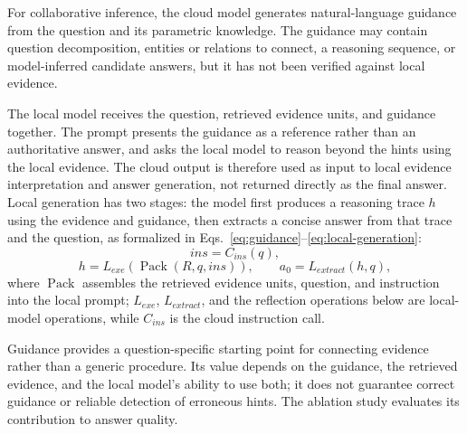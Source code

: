\documentclass[a4paper,fleqn]{cas-dc}
\begin{document}
For collaborative inference, the cloud model generates natural-language guidance from the question and its parametric knowledge. The guidance may contain question decomposition, entities or relations to connect, a reasoning sequence, or model-inferred candidate answers, but it has not been verified against local evidence.

The local model receives the question, retrieved evidence units, and guidance together. The prompt presents the guidance as a reference rather than an authoritative answer, and asks the local model to reason beyond the hints using the local evidence. The cloud output is therefore used as input to local evidence interpretation and answer generation, not returned directly as the final answer. Local generation has two stages: the model first produces a reasoning trace \(h\) using the evidence and guidance, then extracts a concise answer from that trace and the question, as formalized in Eqs.~\eqref{eq:guidance}--\eqref{eq:local-generation}:
\begin{equation}\label{eq:guidance}
ins=C_{ins}(q),
\end{equation}
\begin{equation}\label{eq:local-generation}
h=L_{exe}(\operatorname{Pack}(R,q,ins)),\qquad a_0=L_{extract}(h,q),
\end{equation}
where \(\operatorname{Pack}\) assembles the retrieved evidence units, question, and instruction into the local prompt; \(L_{exe}\), \(L_{extract}\), and the reflection operations below are local-model operations, while \(C_{ins}\) is the cloud instruction call.

Guidance provides a question-specific starting point for connecting evidence rather than a generic procedure. Its value depends on the guidance, the retrieved evidence, and the local model's ability to use both; it does not guarantee correct guidance or reliable detection of erroneous hints. The ablation study evaluates its contribution to answer quality.
\end{document}
